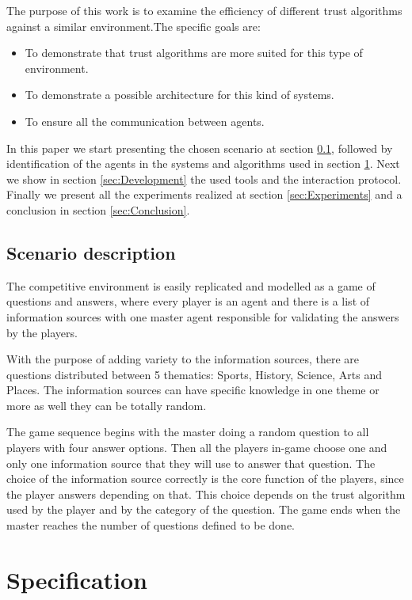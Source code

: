 \documentclass{llncs}
\begin{document}
The purpose of this work is to examine the efficiency of different trust algorithms against a similar environment.The specific goals are:
\begin{itemize}
\item To demonstrate that trust algorithms are more suited for this type of environment.
\item To demonstrate a possible architecture for this kind of systems.
\item To ensure all the communication between agents.
\end{itemize}

In this paper we start presenting the chosen scenario at section \ref{Scenario description}, followed by identification of the agents in the systems and algorithms used in section \ref{sec:Specification}. Next we show in section \ref{sec:Development} the used tools and the interaction protocol. Finally we present all the experiments realized at section \ref{sec:Experiments} and a conclusion in section \ref{sec:Conclusion}.

\subsection{Scenario description}\label{Scenario description}

The competitive environment is easily replicated and modelled as a game of questions and answers, where every player is an agent and there is a list of information sources with one master agent responsible for validating the answers by the players.

With the purpose of adding variety to the information sources, there are questions distributed between 5 thematics: Sports, History, Science, Arts and Places. The information sources can have specific knowledge in one theme or more as well they can be totally random.

The game sequence begins with the master doing a random question to all players with four answer options. Then all the players in-game choose one and only one information source that they will use to answer that question. The choice of the information source correctly is the core function of the players, since the player answers depending on that. This choice depends on the trust algorithm used by the player and by the category of the question. The game ends when the master reaches the number of questions defined to be done.

\section{Specification}\label{sec:Specification}
\end{document}
